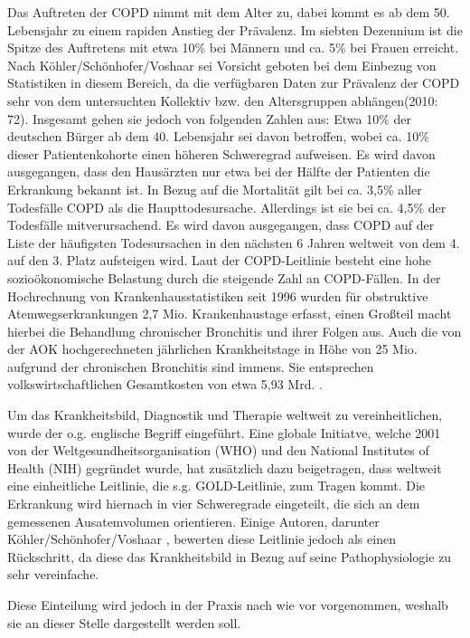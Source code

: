 Das Auftreten der COPD nimmt mit dem Alter zu, dabei kommt es ab dem 50. Lebensjahr zu einem rapiden Anstieg der Prävalenz. Im siebten Dezennium ist die Spitze des Auftretens mit etwa 10\% bei Männern und ca. 5\% bei Frauen erreicht\autocite[vgl.][153]{lorenz2009}. Nach Köhler/Schönhofer/Voshaar sei Vorsicht geboten bei dem Einbezug von Statistiken in diesem Bereich, da die verfügbaren Daten zur Prävalenz der COPD sehr von dem untersuchten Kollektiv bzw. den Altersgruppen abhängen(2010: 72). Insgesamt gehen sie jedoch von folgenden Zahlen aus: Etwa 10\% der deutschen Bürger ab dem 40. Lebensjahr sei davon betroffen, wobei ca. 10\% dieser Patientenkohorte einen höheren Schweregrad aufweisen. Es wird davon ausgegangen, dass den Hausärzten nur etwa bei der Hälfte der Patienten die Erkrankung bekannt ist.
In Bezug auf die Mortalität gilt bei ca. 3,5\% aller Todesfälle COPD als die Haupttodesursache. Allerdings ist sie bei ca. 4,5\% der Todesfälle mitverursachend. Es wird davon ausgegangen, dass COPD auf der Liste der häufigsten Todesursachen in den nächsten 6 Jahren weltweit von dem 4. auf den 3. Platz aufsteigen wird.
Laut der COPD-Leitlinie besteht eine hohe sozioökonomische Belastung durch die steigende Zahl an COPD-Fällen. In der Hochrechnung von Krankenhausstatistiken seit 1996 wurden für obstruktive Atemwegserkrankungen 2,7 Mio. Krankenhaustage erfasst, einen Großteil macht hierbei die Behandlung chronischer Bronchitis und ihrer Folgen aus. Auch die von der AOK hochgerechneten jährlichen Krankheitstage in Höhe von 25 Mio. aufgrund der chronischen Bronchitis sind immens. Sie entsprechen volkswirtschaftlichen Gesamtkosten von etwa 5,93 Mrd. \autocite[vgl.][e4]{vogelmeier2007}.

Um das Krankheitsbild, Diagnostik und Therapie weltweit zu vereinheitlichen, wurde der o.g. englische Begriff eingeführt. Eine globale Initiatve, welche 2001 von der Weltgesundheitsorganisation (WHO) und den National Institutes of Health (NIH) gegründet wurde, hat zusätzlich dazu beigetragen, dass weltweit eine einheitliche Leitlinie, die s.g. GOLD-Leitlinie, zum Tragen kommt. Die Erkrankung wird hiernach in vier Schweregrade eingeteilt, die sich an dem gemessenen Ausatemvolumen orientieren. Einige Autoren, darunter Köhler/Schönhofer/Voshaar \autocite[vgl.][75]{koehler2010}, bewerten diese Leitlinie jedoch als einen Rückschritt, da diese das Krankheitsbild in Bezug auf seine Pathophysiologie zu sehr vereinfache.

Diese Einteilung wird jedoch in der Praxis nach wie vor vorgenommen, weshalb sie an dieser Stelle dargestellt werden soll.


